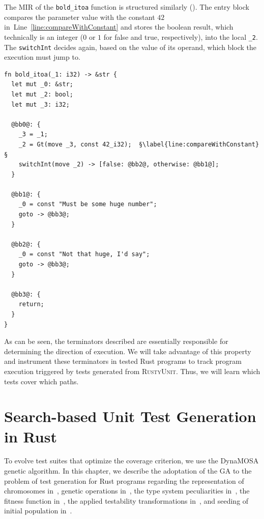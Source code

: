 \documentclass[paper=a4,%
  twoside,%
  BCOR4mm,%
  abstract=true,%
  toc=bibliography,%
  chapterprefix=true,%
  toc=bibliographynumbered,%
  open=right,%
  english,%
  pagesize=pdftex]{scrreprt}
\newcommand{\tech}{\textsc{RustyUnit}\xspace}
\newcommand{\mir}{\ac{MIR}\xspace}
\begin{document}
The \mir of the \texttt{bold\string_itoa} function is structured similarly (). The entry block compares the parameter value with the constant $42$ in~Line~\ref{line:compareWithConstant} and stores the boolean result, which technically is an integer ($0$ or $1$ for false and true, respectively), into the local \texttt{\string_2}. The \texttt{switchInt} decides again, based on the value of its operand, which block the execution must jump to.  

\begin{lstlisting}[language={MIR}, style=boxed, escapechar=§, caption={\mir of the \texttt{bold\string_itoa} function}, label=lst:mir-lowered-second]
fn bold_itoa(_1: i32) -> &str {
  let mut _0: &str;                    
  let mut _2: bool;                    
  let mut _3: i32;                     

  @bb0@: {
    _3 = _1;                         
    _2 = Gt(move _3, const 42_i32);  §\label{line:compareWithConstant}§
    switchInt(move _2) -> [false: @bb2@, otherwise: @bb1@]; 
  }

  @bb1@: {
    _0 = const "Must be some huge number"; 
    goto -> @bb3@;
  }

  @bb2@: {
    _0 = const "Not that huge, I'd say";
    goto -> @bb3@;                     
  }

  @bb3@: {
    return;                          
  }
}
\end{lstlisting}

As can be seen, the terminators described are essentially responsible for determining the direction of execution. We will take advantage of this property and instrument these terminators in tested Rust programs to track program execution triggered by tests generated from \tech. Thus, we will learn which tests cover which paths.

\clearpage
\chapter{Search-based Unit Test Generation in Rust}
\label{chap:sbst-in-rust}
To evolve test suites that optimize the coverage criterion, we use the DynaMOSA genetic algorithm. In this chapter, we describe the adoptation of the \ac{GA} to the problem of test generation for Rust programs regarding the representation of chromosomes in~, genetic operations in~, the type system peculiarities in~, the fitness function in~, the applied testability transformations in~, and seeding of initial population in~. 
\end{document}
